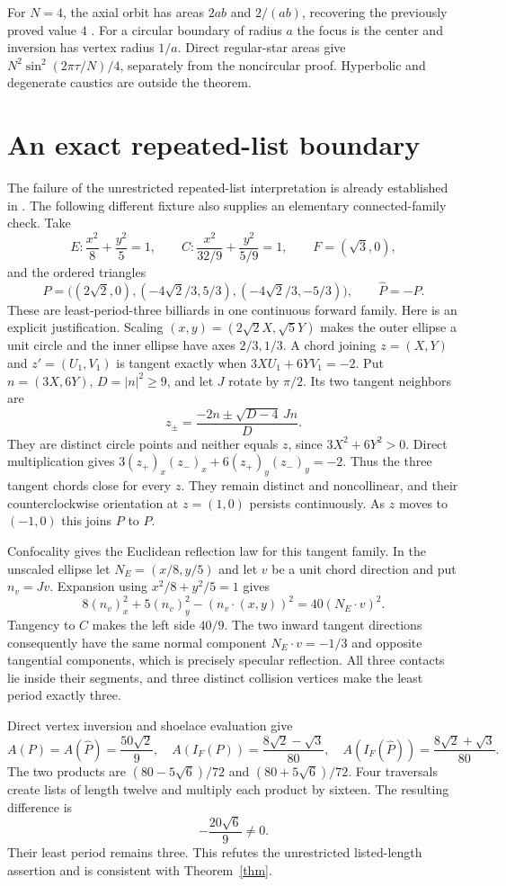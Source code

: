 \documentclass[11pt,letterpaper]{article}
\begin{document}
For $N=4$, the axial orbit has areas $2ab$ and $2/(ab)$, recovering
the previously proved value $4$ \cite{garcia}. For a circular boundary
of radius $a$ the focus is the center and inversion has vertex radius
$1/a$. Direct regular-star areas give
$N^2\sin^2(2\pi\tau/N)/4$, separately from the noncircular proof.
Hyperbolic and degenerate caustics are outside the theorem.

\section{An exact repeated-list boundary}
The failure of the unrestricted repeated-list interpretation is
already established in \cite{ferudun}. The following different
fixture also supplies an elementary connected-family check.
Take
\[
 E:\frac{x^2}{8}+\frac{y^2}{5}=1,\qquad
 C:\frac{x^2}{32/9}+\frac{y^2}{5/9}=1,\qquad F=(\sqrt3,0),
\]
and the ordered triangles
\[
 P=\bigl((2\sqrt2,0),(-4\sqrt2/3,5/3),(-4\sqrt2/3,-5/3)\bigr),
 \qquad \widehat P=-P.
\]
These are least-period-three billiards in one continuous forward
family. Here is an explicit justification. Scaling
$(x,y)=(2\sqrt2 X,\sqrt5 Y)$ makes the outer ellipse a unit circle
and the inner ellipse have axes $2/3,1/3$.
A chord joining $z=(X,Y)$ and $z'=(U_1,V_1)$ is tangent exactly when
$3XU_1+6YV_1=-2$.
Put $n=(3X,6Y)$, $D=|n|^2\ge9$, and let $J$ rotate by $\pi/2$.
Its two tangent neighbors are
\[
                z_\pm=\frac{-2n\pm\sqrt{D-4}\,Jn}{D}.
\]
They are distinct circle points and neither equals $z$, since
$3X^2+6Y^2>0$. Direct multiplication gives
$3(z_+)_x(z_-)_x+6(z_+)_y(z_-)_y=-2$.
Thus the three tangent chords close for every $z$.
They remain distinct and noncollinear, and their counterclockwise
orientation at $z=(1,0)$ persists continuously.
As $z$ moves to $(-1,0)$ this joins $P$ to $\widehat P$.

Confocality gives the Euclidean reflection law for this tangent
family. In the unscaled ellipse let $N_E=(x/8,y/5)$ and let $v$
be a unit chord direction and put $n_v=Jv$.
Expansion using $x^2/8+y^2/5=1$ gives
\[
 8(n_v)_x^2+5(n_v)_y^2-(n_v\cdot(x,y))^2
                                      =40(N_E\cdot v)^2.
\]
Tangency to $C$ makes the left side $40/9$.
The two inward tangent directions consequently have the same
normal component $N_E\cdot v=-1/3$ and opposite tangential
components, which is precisely specular reflection.
All three contacts lie inside their segments, and three distinct
collision vertices make the least period exactly three.

Direct vertex inversion and shoelace evaluation give
\[
 A(P)=A(\widehat P)=\frac{50\sqrt2}{9},\quad
 A(I_F(P))=\frac{8\sqrt2-\sqrt3}{80},\quad
 A(I_F(\widehat P))=\frac{8\sqrt2+\sqrt3}{80}.
\]
The two products are $(80-5\sqrt6)/72$ and
$(80+5\sqrt6)/72$. Four traversals create lists of length twelve
and multiply each product by sixteen. The resulting difference is
\[
                              -\frac{20\sqrt6}{9}\ne0.
\]
Their least period remains three. This refutes the unrestricted
listed-length assertion and is consistent with Theorem~\ref{thm}.
\end{document}
